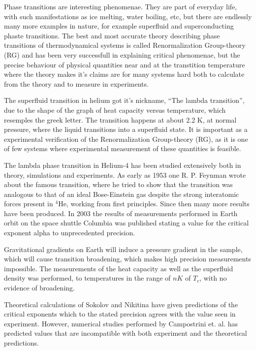%

Phase transitions are interesting phenomenae. They are part of everyday life, with such manifestations as ice melting, water boiling, etc, but there are endlessly many more examples in nature, for example superfluid and superconducting phaste transitions. The best and most accurate theory describing phase transitions of thermodynamical systems is called Renormalization Group-theory (RG) and has been very successfull in explaining critical phenomenae, but the precise behaviour of physical quantities near and at the transtition temperature where the theory makes it's claims are for many systems hard both to calculate from the theory and to measure in experiments.

The superfluid transition in helium got it's nickname, ``The lambda transition'', due to the shape of the graph of heat capacity versus temperature, which resemples the greek letter. The transition happens at about 2.2 K, at normal pressure, where the liquid transitions into a superfluid state. It is important as a experimental verification of the Renormalization Group-theory (RG), as it is one of few systems where experimental measurement of these quantities is feasible. 

The lambda phase transition in Helium-4 has been studied extensively both in theory, simulations and experiments. As early as 1953 one R. P. Feynman wrote about the famous transition, where he tried to show that the transition was analogous to that of an ideal Bose-Einstein gas despite the strong interatomic forces present in $^4$He, working from first principles.
Since then many more results have been produced.
In 2003 the results of measurements performed in Earth orbit on the space shuttle Columbia was published\cite{Lipa2003} stating a value for the critical exponent alpha to unprecedented precision. 

Gravitational gradients on Earth will induce a pressure gradient in the sample, which will cause transition broadening, which makes high precision measurements impossible.
The measurements of the heat capacity as well as the superfluid density was performed, to temperatures in the range of $nK$ of $T_c$, with no evidence of broadening.

Theoretical calculations of Sokolov and Nikitina \cite{Sokolov2016} have given predictions of the critical exponents which to the stated precision agrees with the value seen in experiment.
However, numerical studies performed by Campostrini et. al. \cite{Campostrini2006} has predicted values that are incompatible with both experiment and the theoretical predictions. 

